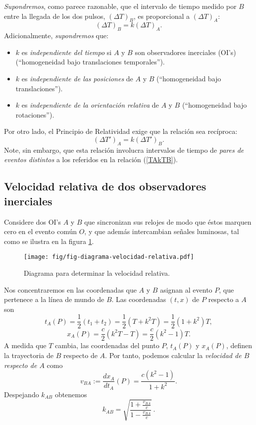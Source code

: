 \textit{Supondremos}, como parece razonable, que el intervalo de tiempo medido por $B$ entre la llegada
de los dos pulsos, $(\Delta T)_B$, es proporcional a $(\Delta T)_A$:
\begin{equation}
(\Delta T)_B=k (\Delta T)_A. \label{TAkTB}
\end{equation}
Adicionalmente, \textit{supondremos} que:
\begin{itemize}
\item $k$ es \textit{independiente del tiempo} si $A$ y $B$ son observadores inerciales (OI's) (``homogeneidad bajo
translaciones temporales'').
\item $k$ es \textit{independiente de las posiciones} de $A$ y $B$ (``homogeneidad bajo translaciones'').
\item $k$ es \textit{independiente de la orientación relativa} de $A$ y $B$ (``homogeneidad bajo rotaciones'').
\end{itemize}

Por otro lado, el Principio de Relatividad exige que la relación sea recíproca:
\begin{equation}
(\Delta T')_A=k (\Delta T')_B .\label{tkt}
\end{equation}
Note, sin embargo, que esta relación involucra intervalos de tiempo de \textit{pares de eventos distintos} a los referidos en la relación (\ref{TAkTB}).

\subsection{Velocidad relativa de dos observadores inerciales}

Considere dos OI's $A$ y $B$ que sincronizan sus relojes de
modo que éstos marquen cero en el evento común $O$, y que además intercambian se\~nales luminosas, tal como se ilustra en la figura \ref{fig:k2}.
\begin{figure}[H]
\centerline{\texttt{[image: fig/fig-diagrama-velocidad-relativa.pdf]}}
 \caption{Diagrama para determinar la velocidad relativa.}
\label{fig:k2}
\end{figure}
Nos concentraremos en las coordenadas que $A$ y $B$ asignan al evento $P$, que  pertenece a la línea de mundo de $B$. Las coordenadas $(t,x)$ de $P$
respecto a $A$ son
\begin{equation}
t_A(P)=\frac{1}{2}(t_1+t_2)=\frac{1}{2}(T + k^2T)=\frac{1}{2}(1+k^2)T,
\end{equation}
\begin{equation}
x_A(P)=\frac{c}{2}(k^2T-T)=\frac{c}{2}(k^2-1)T.
\end{equation}
A medida que $T$ cambia, las coordenadas del punto $P$, $t_A(P)$ y $x_A(P)$, definen la trayectoria de $B$ respecto de $A$. Por tanto, podemos calcular la \textit{velocidad de $B$ respecto de $A$} como
\begin{equation}
v_{BA}:=\frac{dx_A}{dt_A}(P)=\frac{c(k^2-1)}{1+k^2}.
\end{equation}
Despejando $k_{AB}$ obtenemos
\begin{equation}
k_{AB}=\sqrt{\frac{1+\frac{v_{BA}}{c}}{1-\frac{v_{BA}}{c}}} \,.\label{k}
\end{equation}


